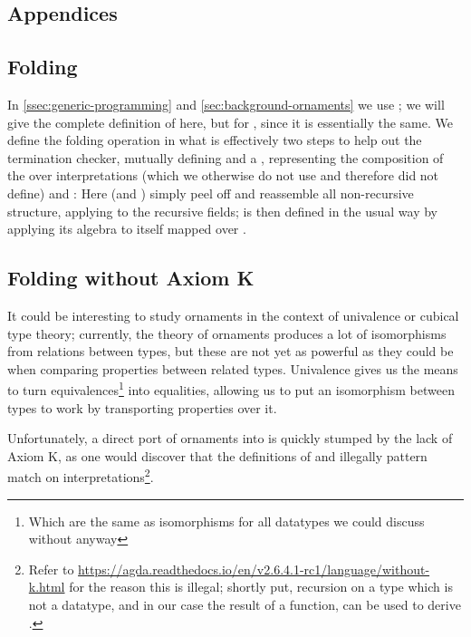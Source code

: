 
\begin{appendix}
\section*{Appendices}
\renewcommand{\thesubsection}{\Alph{subsection}}
    

\subsection{Folding}\label{app:gfold}
In \autoref{ssec:generic-programming} and \autoref{sec:background-ornaments} we use ; we will give the complete definition of  here, but for , since it is essentially the same. We define the folding operation in what is effectively two steps to help out the termination checker, mutually defining  and a , representing the composition of the  over interpretations (which we otherwise do not use and therefore did not define) and :
Here  (and ) simply peel off and reassemble all non-recursive structure, applying  to the recursive fields;  is then defined in the usual way by applying its algebra  to itself mapped over .

\subsection{Folding without Axiom K}\label{app:withoutk}
It could be interesting to study ornaments in the context of univalence or cubical type theory; currently, the theory of ornaments produces a lot of isomorphisms from relations between types, but these are not yet as powerful as they could be when comparing properties between related types. Univalence gives us the means to turn equivalences\footnote{Which are the same as isomorphisms for all datatypes we could discuss without  anyway} into equalities, allowing us to put an isomorphism between types to work by transporting properties over it.

Unfortunately, a direct port of ornaments into  is quickly stumped by the lack of Axiom K, as one would discover that the definitions of  and  illegally pattern match on interpretations\footnote{Refer to \url{https://agda.readthedocs.io/en/v2.6.4.1-rc1/language/without-k.html} for the reason this is illegal; shortly put, recursion on a type which is not a datatype, and in our case the result of a function, can be used to derive .}.


\end{appendix}
